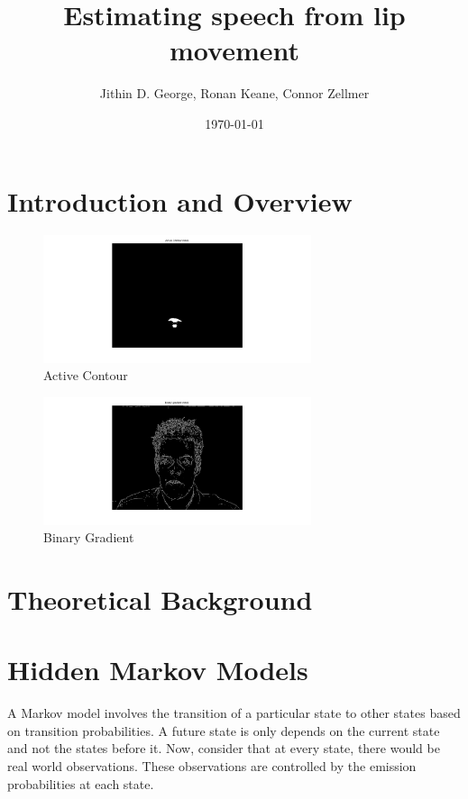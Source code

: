 \documentclass[a4paper]{article}
\title{Estimating speech from lip movement}
\author{Jithin D. George, Ronan Keane, Connor Zellmer}
\date{\today}
\begin{document}
\maketitle

\begin{abstract}

\end{abstract}

\section{Introduction and Overview}
\label{sec:introduction}

\begin{figure}[H] 
	\centering
	\includegraphics[width=0.7\textwidth]{active}
	\caption{Active Contour}	
\end{figure}

\begin{figure}[H] 
	\centering
	\includegraphics[width=0.7\textwidth]{binary}
	\caption{Binary Gradient}	
\end{figure}
\section{Theoretical Background}
\label{sec:theory}

\section{Hidden Markov Models}

A Markov model involves the transition of a particular state to other states based on transition probabilities. A future state is only depends on the current state and not the states before it. Now, consider that at every state, there would be real world observations. These observations are controlled by the emission probabilities at each state.
\end{document}
